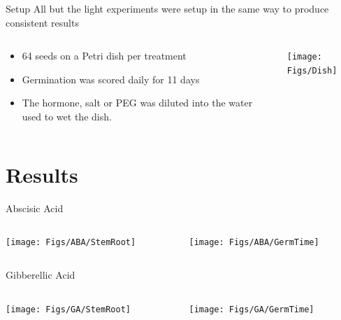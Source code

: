 \documentclass[10pt]{beamer}
\begin{document}
\begin{frame}{Setup}
	All but the light experiments were setup in the same way to produce consistent results
    \begin{columns}[T]
    	\begin{column}{.5\textwidth}
			\begin{itemize}[<+->]
                \pause
				\item 64 seeds on a Petri dish per treatment
                \item Germination was scored daily for 11 days
                \item The hormone, salt or PEG was diluted into the water used to wet the dish.
			\end{itemize}
    	\end{column}
    	\begin{column}{.5\textwidth}
			\texttt{[image: Figs/Dish]}
    	\end{column}
  \end{columns}
\end{frame}



\section{Results}



\begin{frame}{Abscisic Acid}
  \begin{columns}[T]
    \begin{column}{.5\textwidth}
	\texttt{[image: Figs/ABA/StemRoot]}
    \end{column}
    \begin{column}{.5\textwidth}
	\texttt{[image: Figs/ABA/GermTime]}
    \end{column}
  \end{columns}
\end{frame}


\begin{frame}{Gibberellic Acid}
  \begin{columns}[T]
    \begin{column}{.5\textwidth}
	\texttt{[image: Figs/GA/StemRoot]}
    \end{column}
    \begin{column}{.5\textwidth}
	\texttt{[image: Figs/GA/GermTime]}
    \end{column}
  \end{columns}
\end{frame}
\end{document}
